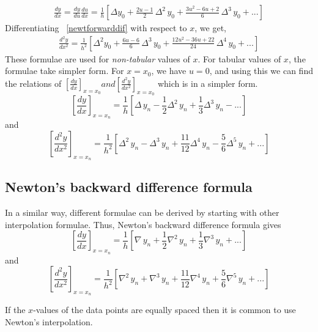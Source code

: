 \documentclass[aima203_lecturenotes_ku.tex]{subfiles}
\begin{document}
\begin{equation}
  \label{newtforwarddif}
  \begin{aligned}
    \frac{dy}{dx} =\frac{dy}{du} \frac{du}{dx} = \frac{1}{h} \left [ \Delta y_0 + \frac{2u -1}{2}\, \Delta^2\,  y_0 + \frac{3u^2-6u + 2}{6}\, \Delta^3 \, y_0 + ... \right ]
  \end{aligned}
\end{equation}
Differentiating ~\ref{newtforwarddif} with respect to $x$, we get,
\begin{equation}
  \label{newtforwarddif2}
  \begin{aligned}
    \frac{d^2y}{dx^2} = \frac{1}{h^2} \left [ \Delta^2 y_0 + \frac{6u -6}{6}\, \Delta^3 \,  y_0 + \frac{12u^2-36u + 22}{24}\, \Delta^4 \, y_0 + ... \right ]
  \end{aligned}
\end{equation}
These formulae are used for \textit{non-tabular} values of $x$. For tabular values of $x$, the formulae take simpler form. For $x=x_0$, we have $u=0$, and using this we can find the relations of $\displaystyle \left [ \frac{dy}{dx} \right ]  _{x=x_0} and \left [\frac{d^2y}{dx^2} \right ] _{x=x_0}$ which is in a simpler form.
\newpage
\begin{equation}
  \label{newtforw1x}
  \left [ \frac{dy}{dx} \right ] _{x=x_n} = \frac{1}{h} \left [\Delta \, y_n - \frac{1}{2} \Delta ^2 \, y_n + \frac{1}{3} \Delta ^3 \, y_n - ... \right ]
\end{equation}
and
\begin{equation}
  \label{newtforw2x}
  \left [ \frac{d^2y}{dx^2} \right ] _{x=x_n} = \frac{1}{h^2} \left [\Delta^2 \, y_n - \Delta ^3 \, y_n + \frac{11}{12} \Delta ^4 \, y_n - \frac{5}{6} \Delta ^5 \, y_n + ... \right ]
\end{equation}

\subsection{Newton's backward difference formula}
In a similar way, different formulae can be derived by starting with other interpolation formulae. Thus, Newton's backward difference formula gives
\begin{equation}
  \label{newtbackwarddif}
  \left [ \frac{dy}{dx} \right ] _{x=x_n} = \frac{1}{h} \left [\nabla \, y_n + \frac{1}{2} \nabla ^2 \, y_n + \frac{1}{3} \nabla ^3 \, y_n + ... \right ]
\end{equation}
and
\begin{equation}
  \label{newtbackwarddif2}
  \left [ \frac{d^2y}{dx^2} \right ] _{x=x_n} = \frac{1}{h^2} \left [\nabla^2 \, y_n + \nabla ^3 \, y_n + \frac{11}{12} \nabla ^4 \, y_n + \frac{5}{6} \nabla ^5 \, y_n + ... \right ]
\end{equation}
\begin{remark}
   If the $x$-values of the data points are equally spaced then it is common to use Newton's interpolation.
\end{remark}
\end{document}
